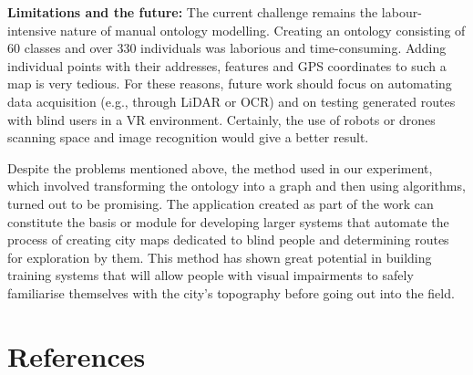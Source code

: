 \documentclass[conference]{IEEEtran}
\begin{document}
{\bf Limitations and the future:} The current challenge remains the labour-intensive nature of manual ontology modelling. 
Creating an ontology consisting of 60 classes and over 330 individuals was laborious and time-consuming.
Adding individual points with their addresses, features and GPS coordinates to such a map is very tedious.
For these reasons, future work should focus on automating data acquisition (e.g., through LiDAR or OCR) and on testing generated routes with blind users in a VR environment.
Certainly, the use of robots or drones scanning space and image recognition would give a better result.

Despite the problems mentioned above, the method used in our experiment, which involved transforming the ontology into a graph and then using algorithms, turned out to be promising.
The application created as part of the work can constitute the basis or module for developing larger systems that automate the process of creating city maps dedicated to blind people and determining routes for exploration by them.
This method has shown great potential in building training systems that will allow people with visual impairments to safely familiarise themselves with the city's topography before going out into the field.

\section*{References}
\end{document}
